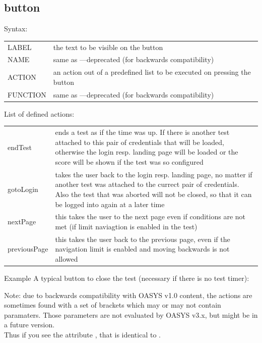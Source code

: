 \documentclass[12pt]{article} %
\newenvironment{keyword}{\leavevmode\color{magenta}}{}
\newenvironment{properties}
	{
    	\footnotesize\renewcommand{\arraystretch}{1.30}
  		\renewcommand{\tabcolsep}{0pt}
   		\begin{longtable}{>{\begin{keyword}}p{3.1cm}<{\end{keyword}}p{13.9cm}}
    	\hline
	}
	{
		\hline\end{longtable}\vspace{5mm}
	}
\begin{document}
\subsection{button}\label{subsec:button}

Syntax:\hspace{0.5cm}\kw{[@BUTTON ... @]}

\begin{properties}
\hline
LABEL & the text to be visible on the button \\
NAME & same as \kw{LABEL}—deprecated (for backwards compatibility) \\
ACTION & an action out of a predefined list to be executed on pressing the button \\
FUNCTION & same as \kw{ACTION}—deprecated (for backwards compatibility) \\
\hline
\end{properties}
\vspace{0.1cm}

List of defined actions:

\begin{properties}
\hline
endTest & ends a test as if the time was up.
If there is another test attached to this pair of credentials that will be loaded, otherwise the login resp.
landing page will be loaded or the score will be shown if the test was so configured \\
gotoLogin & takes the user back to the login resp.
landing page, no matter if another test was attached to the currect pair of credentials.
Also the test that was aborted will not be closed, so that it can be logged into again at a later time \\
nextPage & this takes the user to the next page even if conditions are not met (if limit naviagtion is enabled in the test) \\
previousPage & this takes the user back to the previous page, even if the navigation limit is enabled and moving backwards is not allowed \\
\hline
\end{properties}
\vspace{0.1cm}

\begin{exampleBox}{Example}
	A typical button to close the test (necessary if there is no test timer):\\
	\kw{[@BUTTON LABEL="Close test" ACTION="endTest"@]}
\end{exampleBox}

Note: due to backwards compatibility with OASYS v1.0 content, the actions are sometimes found with a set of brackets which may or may not contain paramaters.
Those parameters are not evaluated by OASYS v3.x, but might be in a future version. \\
Thus if you see the attribute , that is identical to .\\
\end{document}
